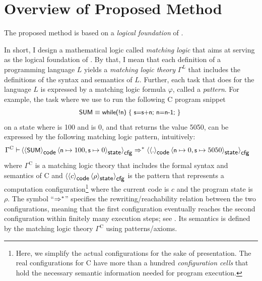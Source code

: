 \documentclass[11pt]{article}
\begin{document}
\section{Overview of Proposed Method}
\label{sec:method}

The proposed method is based on a \emph{logical foundation} of \K.

In short, I design a mathematical logic called \emph{matching logic} that aims 
at serving as the logical foundation of \K. 
By that, I mean that each \K definition of a programming language $L$
yields a \emph{matching logic theory} $\Gamma^L$ that includes the definitions 
of
the syntax and semantics of $L$. 
Further, each task that \K does for the language $L$ 
is expressed by a matching logic formula $\varphi$, called a \emph{pattern}. 
For example, the task where we use \K to run the following C program snippet
$$
\code{SUM} \equiv \code{while(!n) \{ s=s+n; n=n-1; \} }
$$
on a state where  is 100 and  is 0,
and that \K returns the value 5050, can be expressed by the 
following 
matching logic pattern, intuitively:
{\allowdisplaybreaks[0]\begin{align}
\Gamma^\textrm{C} \vdash
& \cell[cfg]{\cell[code]{\code{SUM}} \cell[state]{\code{n}\mapsto 100, 
\code{s}\mapsto 0}} \To^*
\cell[cfg]{\cell[code]{\code{.}} \cell[state]{\code{n}\mapsto 0, 
\code{s}\mapsto 5050}}
\label{eq:po-exe-sum}
\end{align}}%
where $\Gamma^\textrm{C}$ is a matching logic theory that includes the formal 
syntax and semantics of C
and $\cell[cfg]{\cell[code]{c} \cell[state]{\rho}}$
is the pattern that represents a computation configuration\footnote{Here, 
we simplify the actual configurations for the sake of presentation.
The real configurations for C have more than a hundred \emph{configuration cells} that 
hold the necessary semantic information needed for program execution.  }
where the current code is $c$ and the program state is $\rho$. 
The symbol ``$\To^*$'' specifies the rewriting/reachability relation
between the two configurations, meaning that the first configuration
eventually reaches the second configuration within finitely many execution steps; 
see . 
Its semantics is defined by the matching logic theory $\Gamma^\textrm{C}$ using
patterns/axioms.
\end{document}
